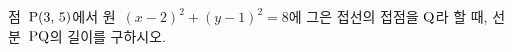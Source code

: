 점~$\mathrm{P}(3,\mkern3mu 5)$에서 원~$(x-2)^2+(y-1)^2=8$에 그은 접선의 접점을 $\mathrm{Q}$라 할 때, 선분~$\mathrm{PQ}$의 길이를 구하시오.

